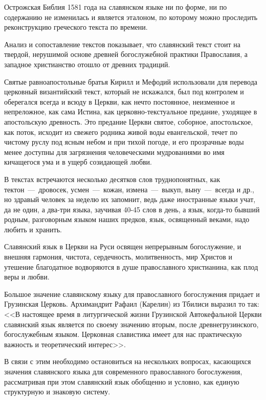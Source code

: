 \documentclass[11pt,a4paper]{memoir}
\begin{document}
    Острожская Библия 1581 года на славянском языке ни по форме, ни по содержанию не изменилась и является эталоном, по которому можно проследить реконструкцию греческого текста по времени.
    
    Анализ и сопоставление текстов показывает, что славянский текст стоит на твердой, нерушимой основе древней богослужебной практики Православия, а западное христианство отошло от древних традиций.
    
    Святые равноапостольные братья Кирилл и Мефодий использовали для перевода церковный византийский текст, который не искажался, был под контролем и оберегался всегда и всюду в Церкви, как нечто постоянное, неизменное и непреложное, как сама Истина, как церковно-текстуальное предание, уходящее в апостольскую древность. Это предание Церкви святое, соборное, апостольское, как поток, исходит из свежего родника живой воды евангельской, течет по чистому руслу под ясным небом и при тихой погоде, и его прозрачные воды менее доступны для загрязнения человеческими мудрованиями во имя кичащегося ума и в ущерб созидающей любви.
    
    В текстах встречаются несколько десятков слов труднопонятных, как тектон~---~дровосек, усмен~---~кожан, измена~---~выкуп, выну~---~всегда и др., но здравый человек за неделю их запомнит, ведь даже иностранные языки учат, да не один, а два-три языка, заучивая 40-45 слов в день, а язык, когда-то бывший родным, разговорным языком наших предков, язык, освященный веками, надо любить и хранить.
    
    Славянский язык в Церкви на Руси освящен непрерывным богослужение, и внешняя гармония, чистота, сердечность, молитвенность, мир Христов и утешение благодатное водворяются в душе православного христианина, как плод веры и любви.
    
    Большое значение славянскому языку для православного богослужения придает и Грузинская Церковь. Архимандрит Рафаил (Карелин) из Тбилиси выразил то так: <<В настоящее время в литургической жизни Грузинской Автокефальной Церкви славянский язык является по своему значению вторым, после древнегрузинского, богослужебным языком. Церковная славистика имеет для нас практическую важность и теоретический интерес>>.
    
    В связи с этим необходимо остановиться на нескольких вопросах, касающихся значения славянского языка для современного православного богослужения, рассматривая при этом славянский язык обобщенно и условно, как единую структурную и знаковую систему.
    
\end{document}
